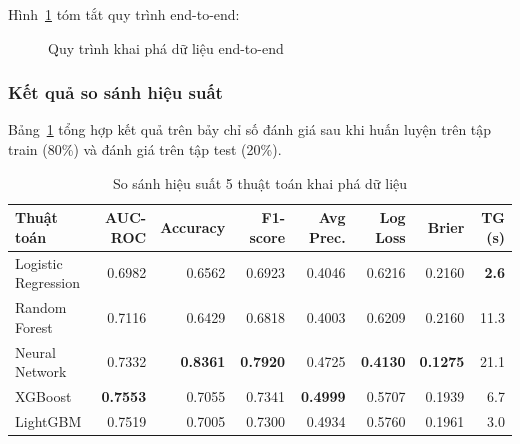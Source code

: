 Hình~\ref{fig:mining_pipeline} tóm tắt quy trình end-to-end:

\begin{figure}[H]
\centering
{}
\caption{Quy trình khai phá dữ liệu end-to-end}
\label{fig:mining_pipeline}
\end{figure}

\subsubsection{Kết quả so sánh hiệu suất}

Bảng~\ref{tab:model_comparison} tổng hợp kết quả trên bảy chỉ số đánh giá
sau khi huấn luyện trên tập train (80\%) và đánh giá trên tập test (20\%).

\renewcommand{\arraystretch}{1.5}
\begin{table}[H]
\centering
\caption{So sánh hiệu suất 5 thuật toán khai phá dữ liệu}
\vspace{5pt}
\small
\setlength{\tabcolsep}{4pt}
\begin{tabular}{|l|r|r|r|r|r|r|r|}
\hline
\textbf{Thuật toán} & \textbf{AUC-ROC} & \textbf{Accuracy} & \textbf{F1-score} & \textbf{Avg Prec.} & \textbf{Log Loss} & \textbf{Brier} & \textbf{TG (s)} \\ \hline
Logistic Regression & 0.6982 & 0.6562 & 0.6923 & 0.4046 & 0.6216 & 0.2160 & \textbf{2.6} \\ \hline
Random Forest       & 0.7116 & 0.6429 & 0.6818 & 0.4003 & 0.6209 & 0.2160 & 11.3 \\ \hline
Neural Network      & 0.7332 & \textbf{0.8361} & \textbf{0.7920} & 0.4725 & \textbf{0.4130} & \textbf{0.1275} & 21.1 \\ \hline
XGBoost             & \textbf{0.7553} & 0.7055 & 0.7341 & \textbf{0.4999} & 0.5707 & 0.1939 & 6.7 \\ \hline
LightGBM            & 0.7519 & 0.7005 & 0.7300 & 0.4934 & 0.5760 & 0.1961 & 3.0 \\ \hline
\end{tabular}
\label{tab:model_comparison}
\end{table}

